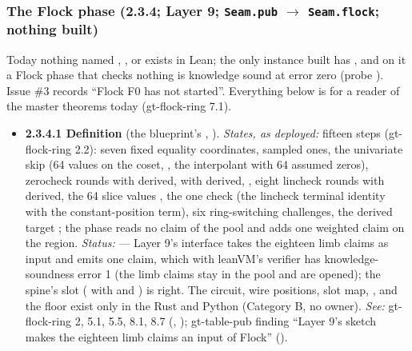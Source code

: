 \subsubsection{The Flock phase (2.3.4; Layer 9; \texttt{Seam.pub} \texorpdfstring{$\to$}{to} \texttt{Seam.flock}; nothing built)}\label{sec:obl-phase-flock}

Today nothing named , ,  or  exists in Lean; the only instance built has , and on it a Flock phase that checks nothing is knowledge sound at error zero (probe ). Issue \#3 records ``Flock F0 has not started''. Everything below is  for a reader of the master theorems today (gt-flock-ring 7.1).

\begin{itemize}[label={}, leftmargin=1.3em, itemindent=-1.3em, labelwidth=0pt, labelsep=0pt, itemsep=4pt, topsep=3pt]
\item {}\label{obl:node-2.3.4.1}\oblflag\textbf{2.3.4.1 Definition} (the blueprint's , ). \emph{States, as deployed:} fifteen steps (gt-flock-ring 2.2): seven fixed equality coordinates,  sampled ones, the univariate skip (64 values on the coset, , the interpolant with 64 assumed zeros),  zerocheck rounds with  derived,  with  derived, , eight lincheck rounds with  derived, the 64 slice values , the one check (the lincheck terminal identity with the  constant-position term), six ring-switching challenges, the derived target ; the phase reads no claim of the pool and adds one weighted claim on the  region. \emph{Status:}   — Layer 9's interface takes the eighteen limb claims as input and emits one claim, which with leanVM's verifier has knowledge-soundness error 1 (the limb claims stay in the pool and are opened); the spine's slot ( with  and ) is right. The circuit, wire positions, slot map, ,  and the floor exist only in the Rust and Python (Category B, no owner). \emph{See:} gt-flock-ring 2, 5.1, 5.5, 8.1, 8.7 (, ); gt-table-pub finding ``Layer 9's sketch makes the eighteen limb claims an input of Flock'' ().

\end{itemize}
